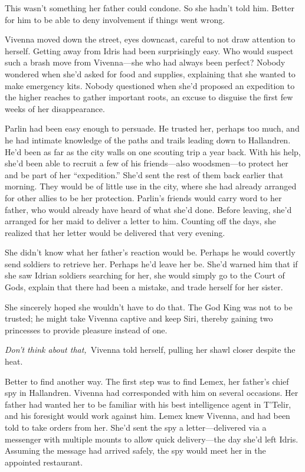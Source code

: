 This wasn’t something her father could condone. So she hadn’t told him. Better for him to be able to deny involvement if things went wrong.

Vivenna moved down the street, eyes downcast, careful to not draw attention to herself. Getting away from Idris had been surprisingly easy. Who would suspect such a brash move from Vivenna—she who had always been perfect? Nobody wondered when she’d asked for food and supplies, explaining that she wanted to make emergency kits. Nobody questioned when she’d proposed an expedition to the higher reaches to gather important roots, an excuse to disguise the first few weeks of her disappearance.

Parlin had been easy enough to persuade. He trusted her, perhaps too much, and he had intimate knowledge of the paths and trails leading down to Hallandren. He’d been as far as the city walls on one scouting trip a year back. With his help, she’d been able to recruit a few of his friends—also woodsmen—to protect her and be part of her “expedition.” She’d sent the rest of them back earlier that morning. They would be of little use in the city, where she had already arranged for other allies to be her protection. Parlin’s friends would carry word to her father, who would already have heard of what she’d done. Before leaving, she’d arranged for her maid to deliver a letter to him. Counting off the days, she realized that her letter would be delivered that very evening.

She didn’t know what her father’s reaction would be. Perhaps he would covertly send soldiers to retrieve her. Perhaps he’d leave her be. She’d warned him that if she saw Idrian soldiers searching for her, she would simply go to the Court of Gods, explain that there had been a mistake, and trade herself for her sister.

She sincerely hoped she wouldn’t have to do that. The God King was not to be trusted; he might take Vivenna captive and keep Siri, thereby gaining two princesses to provide pleasure instead of one.

\textit{Don’t think about that,}~Vivenna told herself, pulling her shawl closer despite the heat.

Better to find another way. The first step was to find Lemex, her father’s chief spy in Hallandren. Vivenna had corresponded with him on several occasions. Her father had wanted her to be familiar with his best intelligence agent in T’Telir, and his foresight would work against him. Lemex knew Vivenna, and had been told to take orders from her. She’d sent the spy a letter—delivered via a messenger with multiple mounts to allow quick delivery—the day she’d left Idris. Assuming the message had arrived safely, the spy would meet her in the appointed restaurant.

